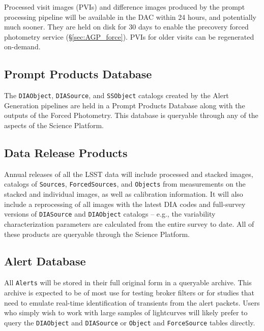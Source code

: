 Processed visit images (PVIs) and difference images produced by the prompt processing pipeline will be available in the DAC within 24 hours, and potentially much sooner.
They are held on disk for 30 days to enable the precovery forced photometry service (\S \ref{sec:AGP_force}).
PVIs for older visits can be regenerated on-demand.

\subsection{Prompt Products Database} \label{sec:ppdb}

The \texttt{DIAObject}, \texttt{DIASource}, and \texttt{SSObject} catalogs created by the Alert Generation pipelines are held in a Prompt Products Database along with the outputs of the Forced Photometry.
This database is queryable through any of the aspects of the Science Platform.


\subsection{Data Release Products} \label{sec:drp}

Annual releases of all the LSST data will include processed and stacked images, catalogs of {\tt Sources}, {\tt ForcedSources}, and {\tt Objects} from measurements on the stacked and individual images, as well as calibration information.
It will also include a  reprocessing of all images with the latest DIA codes and full-survey versions of {\tt DIASource} and {\tt DIAObject} catalogs -- e.g., the variability characterization parameters are calculated from the entire survey to date.
All of these products are queryable through the Science Platform.

\subsection{Alert Database} \label{sec:alertdb}

All {\tt Alerts} will be stored in their full original form in a queryable archive.
This archive is expected to be of most use for testing broker filters or for studies that need to emulate real-time identification of transients from the alert packets.
Users who simply wish to work with large samples of lightcurves will likely prefer to query the \texttt{DIAObject} and \texttt{DIASource} or \texttt{Object} and \texttt{ForceSource} tables directly.

